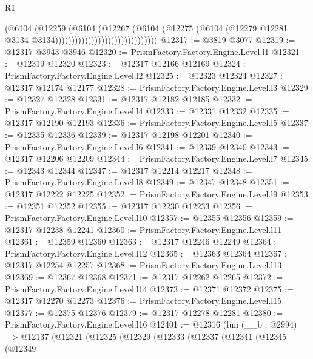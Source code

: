 \begin{lexlean}{R1}
\begin{coremodule}
                                                  (@6104
                                                    (@12259
                                                      (@6104
                                                        (@12267
                                                          (@6104
                                                            (@12275
                                                              (@6104
                                                                (@12279
                                                                  @12281
                                                                  @3134
                                                                  @3134)))))))))))))))))))))))))))))))
@12317 := @3819 @3077
@12319 := @12317 @3943 @3946
@12320 := PrismFactory.Factory.Engine.Level.l1
@12321 := @12319 @12320
@12323 := @12317 @12166 @12169
@12324 := PrismFactory.Factory.Engine.Level.l2
@12325 := @12323 @12324
@12327 := @12317 @12174 @12177
@12328 := PrismFactory.Factory.Engine.Level.l3
@12329 := @12327 @12328
@12331 := @12317 @12182 @12185
@12332 := PrismFactory.Factory.Engine.Level.l4
@12333 := @12331 @12332
@12335 := @12317 @12190 @12193
@12336 := PrismFactory.Factory.Engine.Level.l5
@12337 := @12335 @12336
@12339 := @12317 @12198 @12201
@12340 := PrismFactory.Factory.Engine.Level.l6
@12341 := @12339 @12340
@12343 := @12317 @12206 @12209
@12344 := PrismFactory.Factory.Engine.Level.l7
@12345 := @12343 @12344
@12347 := @12317 @12214 @12217
@12348 := PrismFactory.Factory.Engine.Level.l8
@12349 := @12347 @12348
@12351 := @12317 @12222 @12225
@12352 := PrismFactory.Factory.Engine.Level.l9
@12353 := @12351 @12352
@12355 := @12317 @12230 @12233
@12356 := PrismFactory.Factory.Engine.Level.l10
@12357 := @12355 @12356
@12359 := @12317 @12238 @12241
@12360 := PrismFactory.Factory.Engine.Level.l11
@12361 := @12359 @12360
@12363 := @12317 @12246 @12249
@12364 := PrismFactory.Factory.Engine.Level.l12
@12365 := @12363 @12364
@12367 := @12317 @12254 @12257
@12368 := PrismFactory.Factory.Engine.Level.l13
@12369 := @12367 @12368
@12371 := @12317 @12262 @12265
@12372 := PrismFactory.Factory.Engine.Level.l14
@12373 := @12371 @12372
@12375 := @12317 @12270 @12273
@12376 := PrismFactory.Factory.Engine.Level.l15
@12377 := @12375 @12376
@12379 := @12317 @12278 @12281
@12380 := PrismFactory.Factory.Engine.Level.l16
@12401 := @12316
    (fun (__b : @2994) =>
    @12137
      (@12321
        (@12325
          (@12329
            (@12333
              (@12337
                (@12341
                  (@12345
                    (@12349

\end{coremodule}
\end{lexlean}
